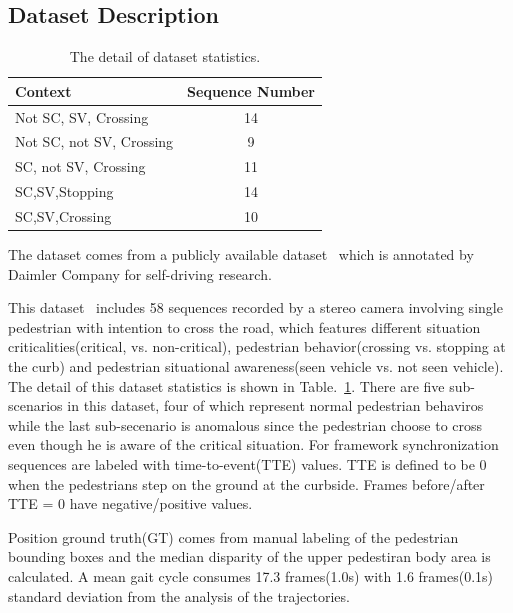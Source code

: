 \documentclass[10pt,twocolumn,letterpaper]{article}
\begin{document}
    \subsection{Dataset Description}
    \begin{table}
        \begin{center}
            \begin{tabular}{|l|c|}
                \hline
                Context & Sequence Number\\
                \hline
                \hline
                Not SC, SV, Crossing & 14\\
                Not SC, not SV, Crossing & 9\\
                SC, not SV, Crossing & 11\\
                SC,SV,Stopping　& 14\\
                SC,SV,Crossing & 10\\
                \hline
            \end{tabular}
        \end{center}
        \caption{The detail of dataset statistics.}
        \label{Statistics}
    \end{table}
    The dataset comes from a publicly available dataset~\cite{IEEEhowto:kooij,IEEEhowto:data} which 
    is annotated by Daimler Company for self-driving research.

    This dataset~\cite{IEEEhowto:data} includes 58 sequences recorded by a stereo camera involving single pedestrian
    with intention to cross the road, which features different situation criticalities(critical,
    vs. non-critical), pedestrian behavior(crossing vs. stopping at the curb) and pedestrian
    situational awareness(seen vehicle vs. not seen vehicle). The detail of this dataset statistics is 
    shown in Table.~\ref{Statistics}. There are five sub-scenarios in this dataset, four of which
    represent normal pedestrian behaviros while the last sub-secenario is anomalous since 
    the pedestrian choose to cross even though he is aware of the critical situation. For framework synchronization sequences
    are labeled with time-to-event(TTE) values. TTE is defined to be 0 when the pedestrians step
    on the ground at the curbside. Frames before/after TTE = 0 have negative/positive values.

    Position ground truth(GT) comes from manual labeling of the pedestrian bounding boxes and the 
    median disparity of the upper pedestiran body area is calculated. A mean gait cycle consumes 
    17.3 frames(1.0s) with 1.6 frames(0.1s) standard deviation from the analysis of the trajectories.
\end{document}
